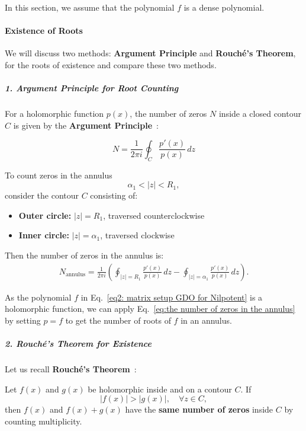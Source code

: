 \documentclass[11pt]{article}
\begin{document}
In this section, we assume that the polynomial $f$ is a dense polynomial. 

\paragraph{Existence of Roots}

We will discuss two methods:  \textbf{Argument Principle} and  \textbf{Rouché’s Theorem}, for the roots of existence and compare these two methods. 

\subparagraph{1. Argument Principle for Root Counting}

For a holomorphic function \(p(x)\), the number of zeros \(N\) inside a closed contour \(C\) is given by the \textbf{Argument Principle}~\cite{beardon2019complex}:

\[
N = \frac{1}{2\pi i} \oint_C \frac{p'(x)}{p(x)} \, dz
\]

To count zeros in the annulus 
\[
\alpha_1 < |z| < R_1,
\] 
consider the contour \(C\) consisting of:

\begin{itemize}
    \item \textbf{Outer circle:} \( |z| = R_1 \), traversed counterclockwise  
    \item \textbf{Inner circle:} \( |z| = \alpha_1 \), traversed clockwise  
\end{itemize}

Then the number of zeros in the annulus is:
%
\begin{eqnarray}\label{eq:the number of zeros in the annulus}
N_{\text{annulus}} 
= \frac{1}{2\pi i} \left( 
\oint_{|z|=R_1} \frac{p'(x)}{p(x)} \, dz
-
\oint_{|z|=\alpha_1} \frac{p'(x)}{p(x)} \, dz
\right).
\end{eqnarray}

As the polynomial $f$ in Eq.~\eqref{eq2: matrix setup GDO for Nilpotent} is a holomorphic function, we can apply Eq.~\eqref{eq:the number of zeros in the annulus} by setting $p=f$ to get the number of roots of $f$ in an annulus. 

\subparagraph{2. Rouché’s Theorem for Existence}

Let us recall \textbf{Rouché’s Theorem}~\cite{tsarpalias1989version}:
  
Let \(f(x)\) and \(g(x)\) be holomorphic inside and on a contour \(C\).  
If 
\[
|f(x)| > |g(x)|, \quad \forall z \in C,
\]  
then \(f(x)\) and \(f(x)+g(x)\) have the \textbf{same number of zeros} inside \(C\) by counting multiplicity.
\end{document}
